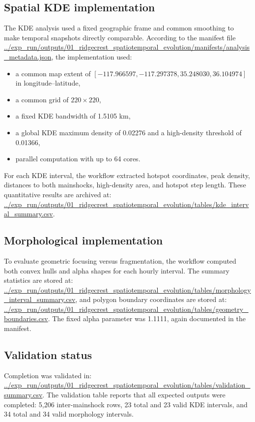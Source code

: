 \documentclass[11pt]{article}
\begin{document}
\subsection{Spatial KDE implementation}
The KDE analysis used a fixed geographic frame and common smoothing to make temporal snapshots directly comparable. According to the manifest file
\url{../exp_run/outputs/01_ridgecrest_spatiotemporal_evolution/manifests/analysis_metadata.json}, the implementation used:
\begin{itemize}[leftmargin=2em]
    \item a common map extent of $[-117.966597, -117.297378, 35.248030, 36.104974]$ in longitude--latitude,
    \item a common grid of $220 \times 220$,
    \item a fixed KDE bandwidth of 1.5105 km,
    \item a global KDE maximum density of 0.02276 and a high-density threshold of 0.01366,
    \item parallel computation with up to 64 cores.
\end{itemize}
For each KDE interval, the workflow extracted hotspot coordinates, peak density, distances to both mainshocks, high-density area, and hotspot step length. These quantitative results are archived at:
\url{../exp_run/outputs/01_ridgecrest_spatiotemporal_evolution/tables/kde_interval_summary.csv}.

\subsection{Morphological implementation}
To evaluate geometric focusing versus fragmentation, the workflow computed both convex hulls and alpha shapes for each hourly interval. The summary statistics are stored at:
\url{../exp_run/outputs/01_ridgecrest_spatiotemporal_evolution/tables/morphology_interval_summary.csv},
and polygon boundary coordinates are stored at:
\url{../exp_run/outputs/01_ridgecrest_spatiotemporal_evolution/tables/geometry_boundaries.csv}.
The fixed alpha parameter was 1.1111, again documented in the manifest.

\subsection{Validation status}
Completion was validated in:
\url{../exp_run/outputs/01_ridgecrest_spatiotemporal_evolution/tables/validation_summary.csv}.
The validation table reports that all expected outputs were completed: 5,206 inter-mainshock rows, 23 total and 23 valid KDE intervals, and 34 total and 34 valid morphology intervals.
\end{document}
